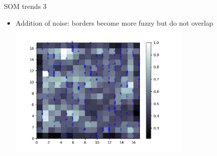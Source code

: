 \documentclass[compress]{beamer}
\begin{document}
	\begin{frame}{SOM trends 3}
		\begin{itemize}
			\item Addition of noise: borders become more fuzzy but do not overlap \\
			\includegraphics[width=0.7\textwidth]{images/SOM_noise.png}
		\end{itemize}
	\end{frame}	
\end{document}
